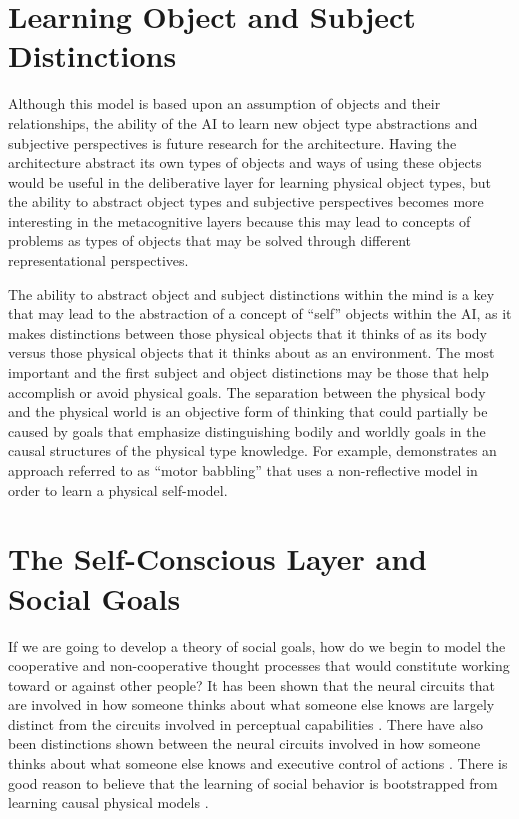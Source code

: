\section{Learning Object and Subject Distinctions}
\label{section:objective_reflection}

Although this model is based upon an assumption of objects and their
relationships, the ability of the AI to learn new object type
abstractions and subjective perspectives is future research for the
architecture.  Having the architecture abstract its own types of
objects and ways of using these objects would be useful in the
deliberative layer for learning physical object types, but the ability
to abstract object types and subjective perspectives becomes more
interesting in the metacognitive layers because this may lead to
concepts of problems as types of objects that may be solved through
different representational perspectives.

The ability to abstract object and subject distinctions within the
mind is a key that may lead to the abstraction of a concept of
``self'' objects within the AI, as it makes distinctions between those
physical objects that it thinks of as its body versus those physical
objects that it thinks about as an environment.  The most important
and the first subject and object distinctions may be those that help
accomplish or avoid physical goals.  The separation between the
physical body and the physical world is an objective form of thinking
that could partially be caused by goals that emphasize distinguishing
bodily and worldly goals in the causal structures of the physical type
knowledge.  For example, \cite{bongard:2006} demonstrates an approach
referred to as ``motor babbling'' that uses a non-reflective model in
order to learn a physical self-model.

\section{The Self-Conscious Layer and Social Goals}

If we are going to develop a theory of social goals, how do we begin
to model the cooperative and non-cooperative thought processes that
would constitute working toward or against other people? It has been
shown that the neural circuits that are involved in how someone thinks
about what someone else knows are largely distinct from the circuits
involved in perceptual capabilities \cite[]{bedny:2009}. There have
also been distinctions shown between the neural circuits involved in
how someone thinks about what someone else knows and executive control
of actions \cite[]{saxe:2006}. There is good reason to believe that
the learning of social behavior is bootstrapped from learning causal
physical models \cite[]{perner:1991}.

